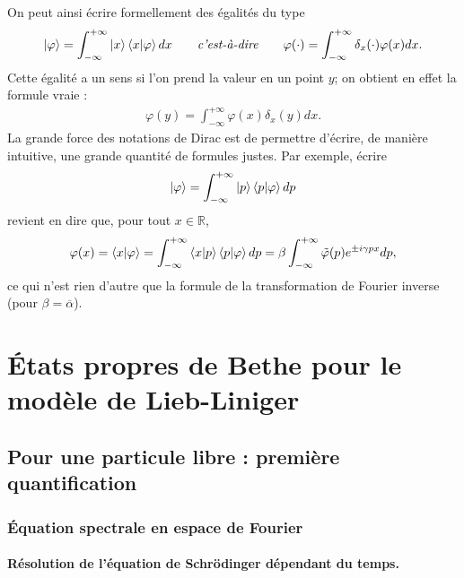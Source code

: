 \begin{Rema}
    On peut ainsi écrire formellement des égalités du type 
    \begin{eqnarray}
        \ket{\varphi} = \int_{-\infty}^{+\infty} \ket{x} \braket{x \vert \varphi} dx \qquad \mbox{\em c'est-à-dire} \qquad \varphi(\cdot) = \int_{-\infty}^{+\infty} \delta_x(\cdot) \varphi(x) dx.
    \end{eqnarray} 
    Cette égalité a un sens si l'on prend la valeur en un point $y$; on obtient en effet la formule  vraie : 
    \begin{eqnarray}
        \varphi(y) = \int_{-\infty}^{+\infty}  \varphi(x) \delta_x(y) dx.
    \end{eqnarray}
    La grande force des notations de Dirac est de permettre d'écrire, de manière intuitive, une grande quantité de formules justes. Par exemple, écrire
    \begin{eqnarray}
        \ket{\varphi} = \int_{-\infty}^{+\infty}  \ket{p} \braket{p\vert \varphi} dp
    \end{eqnarray}   
    revient en dire que, pour tout $x\in \mathbb R$,
    \begin{eqnarray}
        \varphi(x) = \braket{x \vert \varphi} = \int_{-\infty}^{+\infty} \braket{x\vert p}\braket{p \vert \varphi} dp = \beta \int_{-\infty}^{+\infty} \tilde \varphi (p) e^{\pm i \gamma px} dp ,
    \end{eqnarray} 
    ce qui n'est rien d'autre que la formule de la transformation de Fourier inverse (pour $\beta = \overline{\alpha}$).
\end{Rema}

\section{États propres de Bethe pour le modèle de Lieb-Liniger}

\subsection{Pour une particule libre : première quantification}

\subsubsection{Équation spectrale en espace de Fourier}


\paragraph{Résolution de l'équation de Schrödinger dépendant du temps.}

